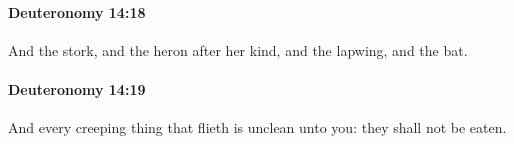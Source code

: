 		\paragraph{Deuteronomy 14:18} %
			\label{DEUTERONOMY-14-18}

			And the stork, and the heron after her kind, and the lapwing, and the bat.


		\paragraph{Deuteronomy 14:19} %
			\label{DEUTERONOMY-14-19}

			And every creeping thing that flieth is unclean unto you: they shall not be eaten.


